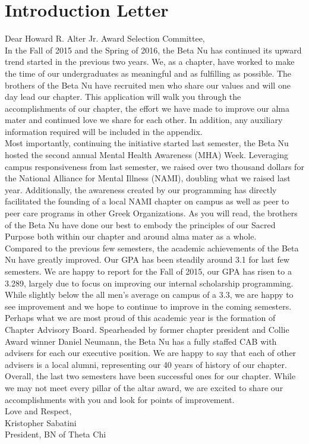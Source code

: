 \chapter{Introduction Letter}

Dear Howard R. Alter Jr. Award Selection Committee, \\

In the Fall of 2015 and the Spring of 2016, the Beta Nu has continued its upward trend started in the previous two years. We, as a chapter, have worked to make the time of our undergraduates as meaningful and as fulfilling as possible.  The brothers of the Beta Nu have recruited men who share our values and will one day lead our chapter. This application will walk you through the accomplishments of our chapter, the effort we have made to improve our alma mater and continued love we share for each other. In addition, any auxiliary information required will be included in the appendix. \\

Most importantly, continuing the initiative started last semester, the Beta Nu hosted the second annual Mental Health Awareness (MHA) Week. Leveraging campus responsiveness from last semester, we raised over two thousand dollars for the National Alliance for Mental Illness (NAMI), doubling what we raised last year. Additionally, the awareness created by our programming has directly facilitated the founding of a local NAMI chapter on campus as well as peer to peer care programs in other Greek Organizations. As you will read, the brothers of the Beta Nu have done our best to embody the principles of our Sacred Purpose both within our chapter and around alma mater as a whole. \\

Compared to the previous few semesters, the academic achievements of the Beta Nu have greatly improved. Our GPA has been steadily around 3.1 for last few semesters. We are happy to report for the Fall of 2015, our GPA has risen to a 3.289, largely due to focus on improving our internal scholarship programming. While slightly below the all men’s average on campus of a 3.3, we are happy to see improvement and we hope to continue to improve in the coming semesters. \\

Perhaps what we are most proud of this academic year is the formation of Chapter Advisory Board. Spearheaded by former chapter president and Collie Award winner Daniel Neumann, the Beta Nu has a fully staffed CAB with advisers for each our executive position. We are happy to say that each of other advisers is a local alumni, representing our 40 years of history of our chapter. \\

Overall, the last two semesters have been successful ones for our chapter. While we may not meet every pillar of the altar award, we are excited to share our accomplishments with you and look for points of improvement. \\

Love and Respect, \\
Kristopher Sabatini \\
President, BN of Theta Chi \\